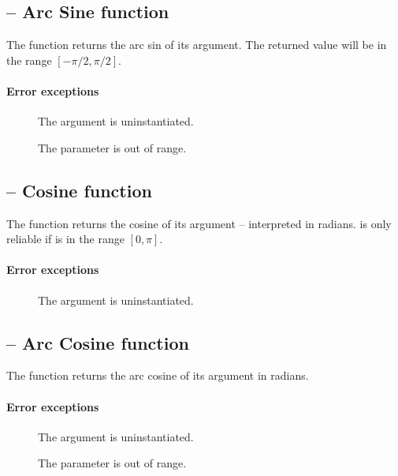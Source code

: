 \subsection{ -- Arc Sine function}
\label{arith:asin}
The  function returns the arc sin of its argument. The returned value will be in the range $[-\pi/2,\pi/2]$.
        
\paragraph{Error exceptions}
\begin{description}
\item[]
The argument is uninstantiated.
\item[]
The parameter is out of range.
\item[]
\end{description}

\subsection{ -- Cosine function}
\label{arith:cos}
     
The  function returns the cosine of its argument -- interpreted in radians.  is only reliable if  is in the range $[0,\pi]$.
        
\paragraph{Error exceptions}
\begin{description}
\item[]
The argument is uninstantiated.
\end{description}

\subsection{ -- Arc Cosine function}
\label{arith:acos}
The  function returns the arc cosine of its argument in radians. 
        
\paragraph{Error exceptions}
\begin{description}
\item[]
The argument is uninstantiated.
\item[]
The parameter is out of range.
\item[]
\end{description}

